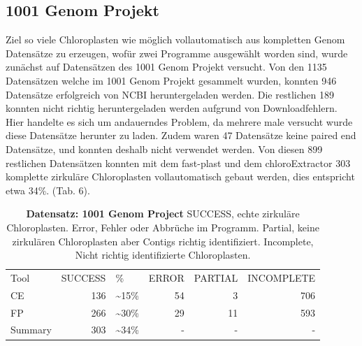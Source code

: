 \documentclass{scrartcl}
\begin{document}
\subsection{1001 Genom Projekt}
\label{sec-4-6}
Ziel so viele Chloroplasten wie möglich vollautomatisch aus kompletten Genom Datensätze zu erzeugen, wofür zwei Programme ausgewählt worden sind, wurde zunächst auf Datensätzen 
des 1001 Genom Projekt versucht.
Von den 1135 Datensätzen welche im 1001 Genom Projekt gesammelt wurden, konnten 946 Datensätze erfolgreich von NCBI heruntergeladen werden. Die restlichen 189 konnten nicht richtig heruntergeladen werden aufgrund von Downloadfehlern.
Hier handelte es sich um andauerndes Problem, da mehrere male versucht wurde diese Datensätze herunter zu laden. 
Zudem waren 47 Datensätze keine paired end Datensätze, und konnten deshalb nicht verwendet werden. Von diesen 899 restlichen Datensätzen konnten mit dem fast-plast und dem chloroExtractor 303 komplette zirkuläre Chloroplasten 
vollautomatisch gebaut werden, dies entspricht etwa 34\%. (Tab. 6). 
\begin{table}[!h]
\caption[Datensatz: 1001 Genom Project]{\textbf{Datensatz: 1001 Genom Project} SUCCESS, echte zirkuläre Chloroplasten. Error, Fehler oder Abbrüche im Programm. Partial, keine zirkulären Chloroplasten aber Contigs richtig identifiziert. Incomplete, Nicht richtig identifizierte Chloroplasten.}
\begin{center}
\begin{tabular}{lrlrrr}
Tool & SUCCESS & \% & ERROR & PARTIAL & INCOMPLETE\\
CE & 136 & \textasciitilde{}15\% & 54 & 3 & 706\\
FP & 266 & \textasciitilde{}30\% & 29 & 11 & 593\\
Summary & 303 & \textasciitilde{}34\% & - & - & -\\
\end{tabular}
\end{center}
\end{table}
\end{document}
